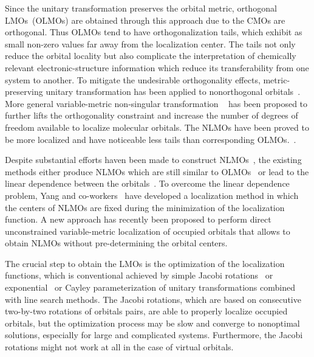 \documentclass[aps,prl,reprint,amsmath,amssymb]{revtex4-1}
\begin{document}
Since the unitary transformation preserves the orbital metric, orthogonal LMOs~(OLMOs) are obtained through this approach due to the CMOs are orthogonal.
Thus OLMOs tend to have orthogonalization tails, which exhibit as small non-zero values far away from the localization center.
The tails not only reduce the orbital locality but also complicate the interpretation of chemically relevant electronic-structure information which reduce its transferability from one system to another.
To mitigate the undesirable orthogonality effects, metric-preserving unitary transformation has been applied to nonorthogonal orbitals~\cite{hoyvik2017generalising}.
More general variable-metric non-singular transformation ~\cite{anderson1968self, diner1968fully, magnasco1974localized, payne1977hartree, mehler1977self, feng2004An_efficient, cui2010efficient} has been proposed to further lifts the orthogonality constraint and increase the number of degrees of freedom available to localize molecular orbitals.
The NLMOs have been proved to be more localized and have noticeable less tails than corresponding OLMOs.~\cite{feng2004An_efficient, liu2000nonorthogonal}.

Despite substantial efforts haven been made to construct NLMOs~\cite{feng2004An_efficient, liu2000nonorthogonal, peng2013effective, hoyvik2017generalising}, the existing methods either produce NLMOs which are still similar to OLMOs~\cite{sundberg1979variationally} or lead to the linear dependence between the orbitals~\cite{feng2004An_efficient}.
To overcome the linear dependence problem, Yang and co-workers~\cite{feng2004An_efficient, cui2010efficient} have developed a localization method in which the centers of NLMOs are fixed during the minimization of the localization function. 
A new approach has recently been proposed to perform direct unconstrained variable-metric localization of occupied orbitals that allows to obtain NLMOs without pre-determining the orbital centers.~\cite{luo2020direct} 

The crucial step to obtain the LMOs is the optimization of the localization functions, which is conventional achieved by simple Jacobi rotations~\cite{edmiston1963localized, barr1975improved} or exponential~\cite{berghold2000general} or Cayley parameterization of unitary transformations combined with line search methods.
The Jacobi rotations, which are based on consecutive two-by-two rotations of orbitals pairs, are able to properly localize occupied orbitals, but the optimization process may be slow and converge to nonoptimal solutions, especially for large and complicated systems.
Furthermore, the Jacobi rotations might not work at all in the case of virtual orbitals.
\end{document}
